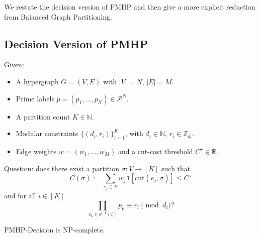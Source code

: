 \documentclass[11pt]{article}
\begin{document}
We restate the decision version of PMHP and then give a more explicit reduction from Balanced Graph Partitioning.

\subsection{Decision Version of PMHP}

\begin{definition}
Given:
\begin{itemize}
  \item A hypergraph $G=(V,E)$ with $|V|=N$, $|E|=M$.
  \item Prime labels $p=(p_1,\dots,p_N)\in\mathcal{P}^N$.
  \item A partition count $K \in \mathbb{N}$.
  \item Modular constraints $\{(d_i,r_i)\}_{i=1}^K$, with $d_i\in\mathbb{N}$, $r_i\in\mathbb{Z}_{d_i}$.
  \item Edge weights $w=(w_1,\dots,w_M)$ and a cut-cost threshold $C^\star \in \mathbb{R}$.
\end{itemize}
Question: does there exist a partition $\sigma:V\to[K]$ such that
\[
  C(\sigma) := \sum_{e_j\in E} w_j \mathbf{1}[\mathrm{cut}(e_j,\sigma)]
    \le C^\star
\]
and for all $i\in[K]$
\[
  \prod_{v_k\in\sigma^{-1}(i)} p_k \equiv r_i \pmod{d_i}?
\]
\end{definition}

\begin{theorem}
\label{thm:pmhp-np-complete}
PMHP-Decision is NP-complete.
\end{theorem}
\end{document}
